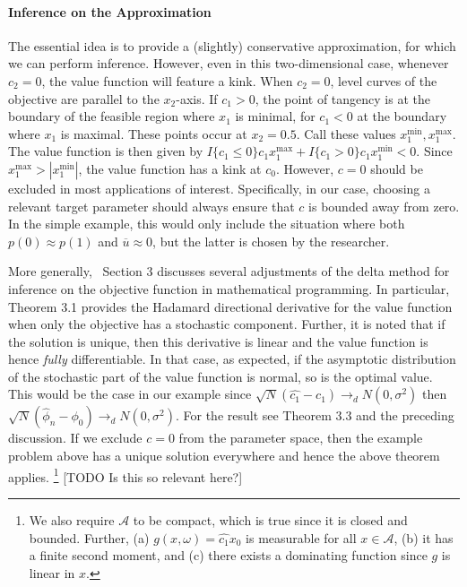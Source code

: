 \documentclass[12pt,a4paper,english]{article} %
\numberwithin{equation}{section}
\theoremstyle{definition}
\theoremstyle{remark}
\theoremstyle{plain}
\begin{document}
\paragraph{Inference on the Approximation}
The essential idea is to provide a (slightly) conservative approximation, for which we can perform inference.
However, even in this two-dimensional case, whenever $c_2=0$, the value function will feature a kink.
When $c_2=0$, level curves of the objective are parallel to the $x_2$-axis.
If $c_1 > 0$, the point of tangency is at the boundary of the feasible region where $x_1$ is minimal, for $c_1 < 0$ at the boundary where $x_1$ is maximal.
These points occur at $x_2=0.5$.
Call these values $x_1^{\min}, x_1^{\max}$.
The value function is then given by $I\{c_1 \leq 0\} c_1 x_1^{\max} + I\{c_1 > 0\} c_1 x_1^{\min} < 0$.
Since $x_1^{\max} > |x_1^{\min}|$, the value function has a kink at $c_0$.
However, $c = 0$ should be excluded in most applications of interest.
Specifically, in our case, choosing a relevant target parameter should always ensure that $c$ is bounded away from zero.
In the simple example, this would only include the situation where both $p(0) \approx p(1)$ and $\overline{u} \approx 0$, but the latter is chosen by the researcher.

More generally,~\cite{shapiro1991asymptotic} Section 3 discusses several adjustments of the delta method for inference on the objective function in mathematical programming.
In particular, Theorem 3.1 provides the Hadamard directional derivative for the value function when only the objective has a stochastic component.
Further, it is noted that if the solution is unique, then this derivative is linear and the value function is hence \textit{fully} differentiable.
In that case, as expected, if the asymptotic distribution of the stochastic part of the value function is normal, so is the optimal value.
This would be the case in our example since $\sqrt{N}(\hat{c_1} - c_1) \to_d N(0,\sigma^2)$ then $\sqrt{N}(\hat{\phi}_n - \phi_0) \to_d N(0,\sigma^2)$.
For the result see Theorem 3.3 and the preceding discussion.
If we exclude $c=0$ from the parameter space, then the example problem above has a unique solution everywhere and hence the above theorem applies.
\footnote{We also require $\mathcal{A}$ to be compact, which is true since it is closed and bounded.
Further, (a) $g(x, \omega) = \hat{c_1}x_0$ is measurable for all $x \in \mathcal{A}$, (b) it has a finite second moment, and (c) there exists a dominating function since $g$ is linear in $x$.}
[TODO Is this so relevant here?]
\end{document}
